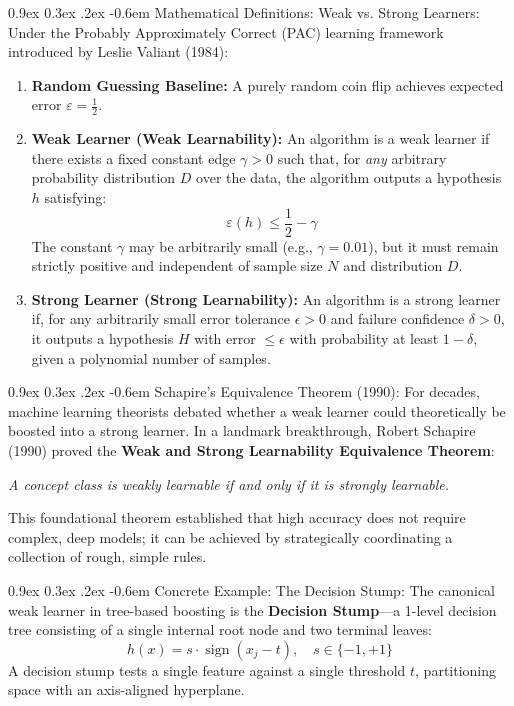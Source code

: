 \documentclass[11pt,a4paper]{article}
\makeatletter
\renewcommand\paragraph{\@startsection{paragraph}{4}{\z@}%
                                     {0.9ex \@plus0.3ex \@minus.2ex}%
                                     {-0.6em}%
                                     {\normalfont\normalsize\bfseries}}
\makeatother
\begin{document}
\paragraph{Mathematical Definitions: Weak vs. Strong Learners:}
Under the Probably Approximately Correct (PAC) learning framework introduced by Leslie Valiant (1984):
\begin{enumerate}
    \item \textbf{Random Guessing Baseline:} A purely random coin flip achieves expected error $\varepsilon = \frac{1}{2}$.
    \item \textbf{Weak Learner (Weak Learnability):} An algorithm is a weak learner if there exists a fixed constant edge $\gamma > 0$ such that, for \emph{any} arbitrary probability distribution $D$ over the data, the algorithm outputs a hypothesis $h$ satisfying:
    \begin{equation}
        \varepsilon(h) \le \frac{1}{2} - \gamma
    \end{equation}
    The constant $\gamma$ may be arbitrarily small (e.g., $\gamma = 0.01$), but it must remain strictly positive and independent of sample size $N$ and distribution $D$.
    \item \textbf{Strong Learner (Strong Learnability):} An algorithm is a strong learner if, for any arbitrarily small error tolerance $\epsilon > 0$ and failure confidence $\delta > 0$, it outputs a hypothesis $H$ with error $\le \epsilon$ with probability at least $1 - \delta$, given a polynomial number of samples.
\end{enumerate}

\paragraph{Schapire's Equivalence Theorem (1990):}
For decades, machine learning theorists debated whether a weak learner could theoretically be boosted into a strong learner. In a landmark breakthrough, Robert Schapire (1990) proved the \textbf{Weak and Strong Learnability Equivalence Theorem}:
\begin{center}
    \emph{A concept class is weakly learnable if and only if it is strongly learnable.}
\end{center}
This foundational theorem established that high accuracy does not require complex, deep models; it can be achieved by strategically coordinating a collection of rough, simple rules.

\paragraph{Concrete Example: The Decision Stump:}
The canonical weak learner in tree-based boosting is the \textbf{Decision Stump}---a 1-level decision tree consisting of a single internal root node and two terminal leaves:
\begin{equation}
    h(x) = s \cdot \operatorname{sign}(x_j - t), \quad s \in \{-1, +1\}
\end{equation}
A decision stump tests a single feature against a single threshold $t$, partitioning space with an axis-aligned hyperplane. 
\end{document}
